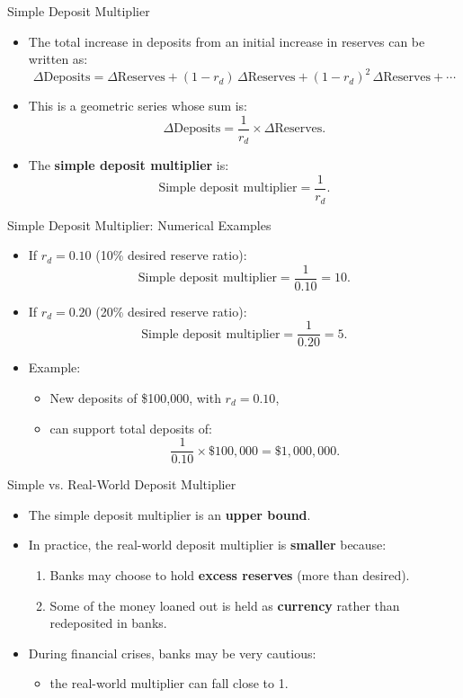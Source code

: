 \documentclass[aspectratio=169]{beamer}
\begin{document}
\begin{frame}{Simple Deposit Multiplier}
\transfade
\begin{itemize}[<+->]
  \item The total increase in deposits from an initial increase in reserves can be written as:
  \[
    \Delta \text{Deposits} =
      \Delta \text{Reserves}
      + (1 - r_{d})\,\Delta \text{Reserves}
      + (1 - r_{d})^{2}\,\Delta \text{Reserves}
      + \cdots
  \]
  \item This is a geometric series whose sum is:
  \[
    \Delta \text{Deposits}
      = \frac{1}{r_{d}} \times \Delta \text{Reserves}.
  \]
  \item The \textbf{simple deposit multiplier} is:
  \[
    \text{Simple deposit multiplier} = \frac{1}{r_{d}}.
  \]
\end{itemize}
\end{frame}

\begin{frame}{Simple Deposit Multiplier: Numerical Examples}
\transfade
\begin{itemize}[<+->]
  \item If \(r_{d} = 0.10\) (10\% desired reserve ratio):
  \[
    \text{Simple deposit multiplier} = \frac{1}{0.10} = 10.
  \]
  \item If \(r_{d} = 0.20\) (20\% desired reserve ratio):
  \[
    \text{Simple deposit multiplier} = \frac{1}{0.20} = 5.
  \]
  \item Example:
  \begin{itemize}[<+->]
    \item New deposits of \$100{,}000, with \(r_{d} = 0.10\),
    \item can support total deposits of:
    \[
      \frac{1}{0.10} \times \$100{,}000 = \$1{,}000{,}000.
    \]
  \end{itemize}
\end{itemize}
\end{frame}

\begin{frame}{Simple vs. Real-World Deposit Multiplier}
\transfade
\begin{itemize}[<+->]
  \item The simple deposit multiplier is an \textbf{upper bound}.
  \item In practice, the real-world deposit multiplier is \textbf{smaller} because:
  \begin{enumerate}[<+->]
    \item Banks may choose to hold \textbf{excess reserves} (more than desired).
    \item Some of the money loaned out is held as \textbf{currency} rather than redeposited in banks.
  \end{enumerate}
  \item During financial crises, banks may be very cautious:
  \begin{itemize}[<+->]
    \item the real-world multiplier can fall close to 1.
  \end{itemize}
\end{itemize}
\end{frame}
\end{document}
